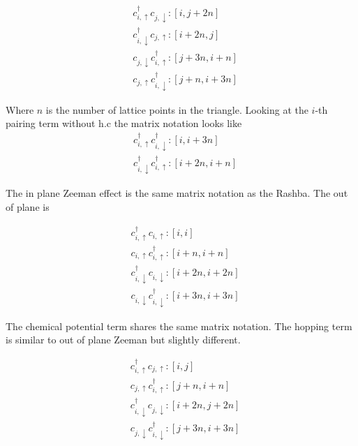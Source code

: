 \begin{align}
  &c^{\dagger}_{i,\uparrow}c_{j,\downarrow} : [i,j+2n] \\
  &c^{\dagger}_{i,\downarrow}c_{j,\uparrow} : [i+2n,j] \\ 
  &c_{j,\downarrow}c^{\dagger}_{i,\uparrow} : [j+3n,i+n] \\
  &c_{j,\uparrow}  c^{\dagger}_{i,\downarrow} : [j+n,i+3n]
\end{align}

Where $n$ is the number of lattice points in the triangle. Looking at the $i$-th pairing term without h.c the matrix notation looks like
\begin{align}
  &c^{\dagger}_{i,\uparrow}c^{\dagger}_{i,\downarrow}: [i,i+3n] \\
  &c^{\dagger}_{i,\downarrow}c^{\dagger}_{i,\uparrow}: [i+2n,i+n]
\end{align}

The in plane Zeeman effect is the same matrix notation as the Rashba. The out of plane is

\begin{align}
  &c^{\dagger}_{i,\uparrow}c_{i,\uparrow} : [i,i] \\
  &c_{i,\uparrow}c^{\dagger}_{i,\uparrow} : [i+n,i+n] \\
  &c^{\dagger}_{i,\downarrow}c_{i,\downarrow} : [i+2n,i+2n] \\
  &c_{i,\downarrow}c^{\dagger}_{i,\downarrow} : [i+3n,i+3n]
\end{align}

The chemical potential term shares the same matrix notation. The hopping term is similar to out of plane Zeeman but slightly different.

\begin{align}
  &c^{\dagger}_{i,\uparrow}c_{j,\uparrow} : [i,j] \\
  &c_{j,\uparrow}c^{\dagger}_{i,\uparrow} : [j+n,i+n] \\
  &c^{\dagger}_{i,\downarrow}c_{j,\downarrow} : [i+2n,j+2n] \\
  &c_{j,\downarrow}c^{\dagger}_{i,\downarrow} : [j+3n,i+3n]
\end{align}



